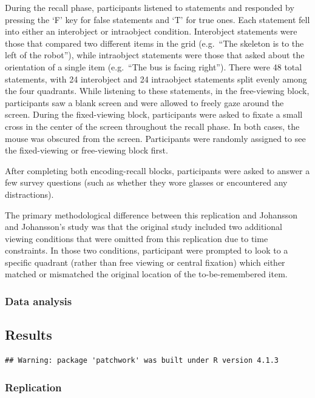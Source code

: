 \documentclass[
  man,floatsintext]{apa6}
\begin{document}
During the recall phase, participants listened to statements and responded by pressing the `F' key for false statements and `T' for true ones. Each statement fell into either an interobject or intraobject condition. Interobject statements were those that compared two different items in the grid (e.g.~``The skeleton is to the left of the robot''), while intraobject statements were those that asked about the orientation of a single item (e.g.~``The bus is facing right''). There were 48 total statements, with 24 interobject and 24 intraobject statements split evenly among the four quadrants. While listening to these statements, in the free-viewing block, participants saw a blank screen and were allowed to freely gaze around the screen. During the fixed-viewing block, participants were asked to fixate a small cross in the center of the screen throughout the recall phase. In both cases, the mouse was obscured from the screen. Participants were randomly assigned to see the fixed-viewing or free-viewing block first.

After completing both encoding-recall blocks, participants were asked to answer a few survey questions (such as whether they wore glasses or encountered any distractions).

The primary methodological difference between this replication and Johansson and Johansson's study was that the original study included two additional viewing conditions that were omitted from this replication due to time constraints. In those two conditions, participant were prompted to look to a specific quadrant (rather than free viewing or central fixation) which either matched or mismatched the original location of the to-be-remembered item.

\hypertarget{data-analysis}{%
\subsubsection{Data analysis}\label{data-analysis}}

\hypertarget{results-1}{%
\subsection{Results}\label{results-1}}

\begin{verbatim}
## Warning: package 'patchwork' was built under R version 4.1.3
\end{verbatim}

\hypertarget{replication-1}{%
\subsubsection{Replication}\label{replication-1}}
\end{document}

